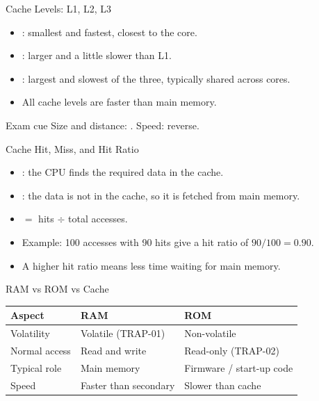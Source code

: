 \documentclass[aspectratio=169]{beamer}
\begin{document}
\begin{frame}{Cache Levels: L1, L2, L3}
  \begin{itemize}
    \item {}: smallest and fastest, closest to the core.
    \item {}: larger and a little slower than L1.
    \item {}: largest and slowest of the three, typically shared
      across cores.
    \item All cache levels are faster than main memory.
  \end{itemize}
  \begin{block}{Exam cue}
    Size and distance: . Speed: reverse.
  \end{block}
\end{frame}

\begin{frame}{Cache Hit, Miss, and Hit Ratio}
  \begin{itemize}
    \item {}: the CPU finds the required data in the cache.
    \item {}: the data is not in the cache, so it is fetched from
      main memory.
    \item {} $=$ hits $\div$ total accesses.
    \item Example: 100 accesses with 90 hits give a hit ratio of
      $90/100 = 0.90$.
    \item A higher hit ratio means less time waiting for main memory.
  \end{itemize}
\end{frame}

\begin{frame}{RAM vs ROM vs Cache}
  \begin{center}
    \begin{tabular}{lll}
      \toprule
      \textbf{Aspect} & \textbf{RAM} & \textbf{ROM} \\
      \midrule
      Volatility & Volatile (TRAP-01) & Non-volatile \\
      Normal access & Read and write & Read-only (TRAP-02) \\
      Typical role & Main memory & Firmware / start-up code \\
      Speed & Faster than secondary & Slower than cache \\
      \bottomrule
    \end{tabular}
  \end{center}
  \vspace{0.2cm}
\end{frame}
\end{document}

